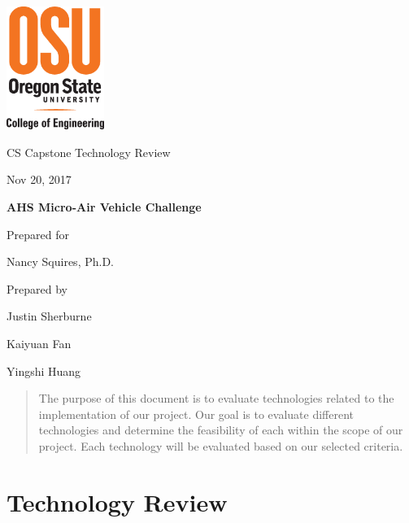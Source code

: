 \documentclass[onecolumn, draftclsnofoot,10pt, compsoc]{IEEEtran}
\def \GroupMemberOne{			Justin Sherburne}
\def \GroupMemberTwo{			Kaiyuan Fan}
\def \GroupMemberThree{			Yingshi Huang}
\def \CapstoneProjectName{		AHS Micro-Air Vehicle Challenge}
\def \CapstoneSponsorPerson{		Nancy Squires, Ph.D.}
\newcommand{\NameSigPair}[1]{\par
\makebox[2.75in][r]{#1} \hfil 	\makebox[3.25in]{\makebox[2.25in]{\hrulefill} \hfill		\makebox[.75in]{\hrulefill}}
\par\vspace{-12pt} \textit{\tiny\noindent
\makebox[2.75in]{} \hfil		\makebox[3.25in]{\makebox[2.25in][r]{Signature} \hfill	\makebox[.75in][r]{Date}}}}
\renewcommand{\NameSigPair}[1]{#1}
\begin{document}
\newpage
	\includegraphics[height=4cm]{coe_v_spot1}
        \hfill    
        \par\vspace{.5in}
        \begin{scshape}
        \centering
            \huge CS Capstone Technology Review \par
            {\large{Nov 20, 2017}}\par
            \vspace{8pt}
            \textbf{\Huge\CapstoneProjectName}\par
			\vspace{.5in}
                        {\large Prepared for}\par
            {\Large\NameSigPair{\CapstoneSponsorPerson}\par}
			\vspace{3pt}
            {\large Prepared by }\par
            \vspace{8pt}
            {\Large
                \NameSigPair{\GroupMemberOne}\par
                \NameSigPair{\GroupMemberTwo}\par
                \NameSigPair{\GroupMemberThree}\par
            }
            \vspace{.5in}
           \end{scshape}
        \begin{abstract}
        The purpose of this document is to evaluate technologies related to the implementation of our project. Our goal is to evaluate different technologies and determine the feasibility of each within the scope of our project. Each technology will be evaluated based on our selected criteria.  
        \end{abstract}   
        \normalsize

\newpage

\section{Technology Review}
\end{document}
